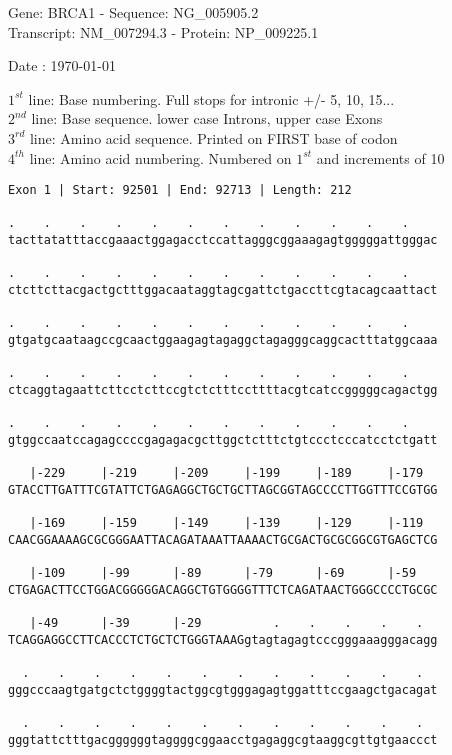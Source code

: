 \documentclass{article}
\begin{document}
\begin{center}
\begin{large}
Gene: BRCA1 - Sequence: NG\_005905.2\\
Transcript: NM\_007294.3 - Protein: NP\_009225.1
 
 Date : \today
\end{large}
\end{center}
$1^{st}$ line: Base numbering. Full stops for intronic +/- 5, 10, 15...\\
$2^{nd}$ line: Base sequence. lower case Introns, upper case Exons\\
$3^{rd}$ line: Amino acid sequence. Printed on FIRST base of codon\\
$4^{th}$ line: Amino acid numbering. Numbered on $1^{st}$ and increments of 10\\
\begin{Verbatim}[fontfamily=courier]
Exon 1 | Start: 92501 | End: 92713 | Length: 212

.    .    .    .    .    .    .    .    .    .    .    .    
tacttatatttaccgaaactggagacctccattagggcggaaagagtgggggattgggac

.    .    .    .    .    .    .    .    .    .    .    .    
ctcttcttacgactgctttggacaataggtagcgattctgaccttcgtacagcaattact

.    .    .    .    .    .    .    .    .    .    .    .    
gtgatgcaataagccgcaactggaagagtagaggctagagggcaggcactttatggcaaa

.    .    .    .    .    .    .    .    .    .    .    .    
ctcaggtagaattcttcctcttccgtctctttccttttacgtcatccgggggcagactgg

.    .    .    .    .    .    .    .    .    .    .    .    
gtggccaatccagagccccgagagacgcttggctctttctgtccctcccatcctctgatt

   |-229     |-219     |-209     |-199     |-189     |-179  
GTACCTTGATTTCGTATTCTGAGAGGCTGCTGCTTAGCGGTAGCCCCTTGGTTTCCGTGG

   |-169     |-159     |-149     |-139     |-129     |-119  
CAACGGAAAAGCGCGGGAATTACAGATAAATTAAAACTGCGACTGCGCGGCGTGAGCTCG

   |-109     |-99      |-89      |-79      |-69      |-59   
CTGAGACTTCCTGGACGGGGGACAGGCTGTGGGGTTTCTCAGATAACTGGGCCCCTGCGC

   |-49      |-39      |-29          .    .    .    .    .  
TCAGGAGGCCTTCACCCTCTGCTCTGGGTAAAGgtagtagagtcccgggaaagggacagg

  .    .    .    .    .    .    .    .    .    .    .    .  
gggcccaagtgatgctctggggtactggcgtgggagagtggatttccgaagctgacagat

  .    .    .    .    .    .    .    .    .    .    .    .  
gggtattctttgacggggggtaggggcggaacctgagaggcgtaaggcgttgtgaaccct

\end{Verbatim}
\end{document}
